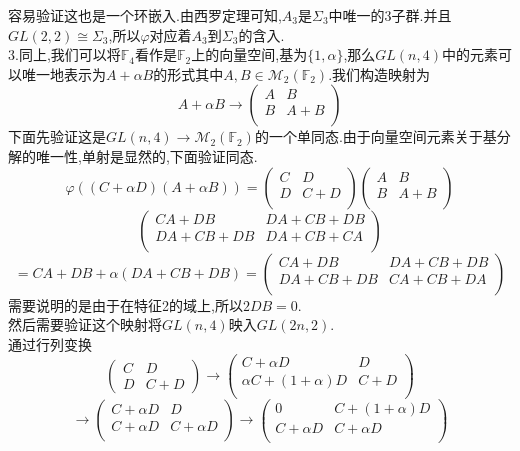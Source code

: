 \documentclass[b5paper]{ctexart}
\begin{document}
容易验证这也是一个环嵌入.由西罗定理可知,$A_3$是$\Sigma_3$中唯一的3子群.并且$GL(2,2)\cong\Sigma_3$,所以$\varphi$对应着$A_3$到$\Sigma_3$的含入.\\
3.同上,我们可以将$\mathbb{F}_4$看作是$\mathbb{F}_2$上的向量空间,基为$\{1,\alpha\}$,那么$GL(n,4)$中的元素可以唯一地表示为$A+\alpha B$的形式其中$A,B\in \mathcal{M}_2(\mathbb{F}_2)$.我们构造映射为
\[A+\alpha B\to \left( \begin{array}{cc}
A & B\\
B & A+B\\
\end{array}\right) \]
下面先验证这是$GL(n,4)\to \mathcal{M}_2(\mathbb{F}_2)$的一个单同态.由于向量空间元素关于基分解的唯一性,单射是显然的,下面验证同态.
\[\varphi((C+\alpha D)(A+\alpha B))= \left( \begin{array}{cc}
C & D\\
D & C+D\\
\end{array}\right) \left( \begin{array}{cc}
A & B\\
B & A+B\\
\end{array}\right)\]
\[\left( \begin{array}{cc}
CA+DB & DA+CB+DB\\
DA+CB+DB  & DA+CB+CA\\
\end{array}\right)\]
\[=CA+DB+\alpha(DA+CB+DB)=\left( \begin{array}{cc}
CA+DB & DA+CB+DB\\
DA+CB+DB & CA+CB+DA\\
\end{array}\right) \]
需要说明的是由于在特征2的域上,所以$2DB=0$.\\
然后需要验证这个映射将$GL(n,4)$映入$GL(2n,2)$.\\
通过行列变换
\[\left( \begin{array}{cc}
C & D\\
D & C+D
\end{array}\right) \to \left( \begin{array}{cc}
C+\alpha D & D\\
\alpha C+(1+\alpha)D & C+D\\
\end{array}\right)\]\[ \to \left( \begin{array}{cc}
C+\alpha D & D\\
C+\alpha D & C+\alpha D\\
\end{array}\right) \to\left( \begin{array}{cc}
0 & C+(1+\alpha)D\\
C+\alpha D & C+\alpha D\\
\end{array}\right)  \]
\end{document}

